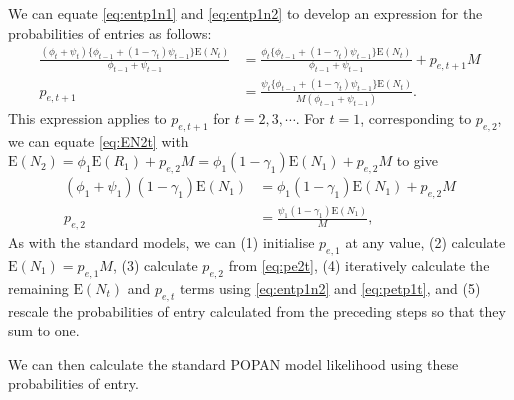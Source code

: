 \documentclass{article}
\newcommand{\E}[1]{\mathrm{E}(#1)}
\begin{document}
We can equate \eqref{eq:entp1n1} and \eqref{eq:entp1n2} to develop an
expression for the probabilities of entries as follows:
\begin{align}
  \frac{(\phi_t + \psi_t) \{ \phi_{t - 1} + (1 - \gamma_t) \psi_{t - 1}\}
    \E{N_t}}{\phi_{t - 1} + \psi_{t - 1}} &= \frac{\phi_t \{ \phi_{t - 1} + (1 - \gamma_t) \psi_{t - 1}\}
                                            \E{N_t}}{\phi_{t - 1} + \psi_{t - 1}} + p_{e, t + 1}M \\
  p_{e, t + 1} &= \frac{\psi_t \{ \phi_{t - 1} + (1 - \gamma_t)\psi_{t - 1} \} \E{N_t}}{M(\phi_{t - 1} + \psi_{t - 1})}. \label{eq:petp1t}
\end{align}
This expression applies to $p_{e, t + 1}$ for $t = 2, 3, \cdots$.  For
$t = 1$, corresponding to $p_{e, 2}$, we can equate \eqref{eq:EN2t}
with
$\E{N_2} = \phi_1\E{R_1} + p_{e, 2} M = \phi_1 (1 - \gamma_1) \E{N_1}
+ p_{e, 2}M$ to give
\begin{align}
  (\phi_1 + \psi_1) (1 - \gamma_1) \E{N_1} &= \phi_1 (1 - \gamma_1) \E{N_1}
                                             + p_{e, 2}M \\
  p_{e, 2} &= \frac{\psi_1 (1 - \gamma_1) \E{N_1}}{M}, \label{eq:pe2t}
\end{align}
As with the standard models, we can (1) initialise $p_{e, 1}$ at any
value, (2) calculate $\E{N_1} = p_{e, 1} M$, (3) calculate $p_{e, 2}$
from \eqref{eq:pe2t}, (4) iteratively calculate the remaining
$\E{N_t}$ and $p_{e, t}$ terms using \eqref{eq:entp1n2} and
\eqref{eq:petp1t}, and (5) rescale the probabilities of entry
calculated from the preceding steps so that they sum to one.

We can then calculate the standard POPAN model likelihood using these
probabilities of entry.


 
\end{document}
